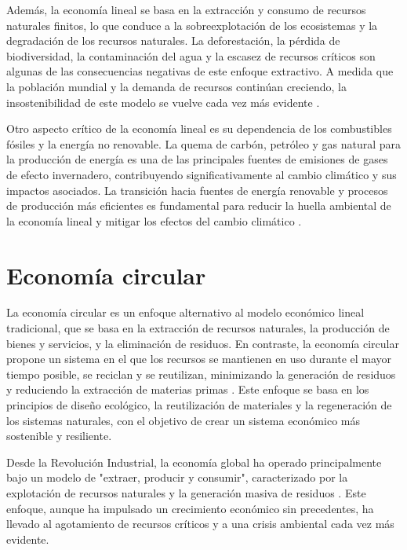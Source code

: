 \documentclass[main.tex]{subfiles}
\begin{document}
Además, la economía lineal se basa en la extracción y consumo de recursos naturales finitos, lo que conduce a la sobreexplotación de los ecosistemas y la degradación de los recursos naturales. La deforestación, la pérdida de biodiversidad, la contaminación del agua y la escasez de recursos críticos son algunas de las consecuencias negativas de este enfoque extractivo. A medida que la población mundial y la demanda de recursos continúan creciendo, la insostenibilidad de este modelo se vuelve cada vez más evidente \cite{clima2022book}.

Otro aspecto crítico de la economía lineal es su dependencia de los combustibles fósiles y la energía no renovable. La quema de carbón, petróleo y gas natural para la producción de energía es una de las principales fuentes de emisiones de gases de efecto invernadero, contribuyendo significativamente al cambio climático y sus impactos asociados. La transición hacia fuentes de energía renovable y procesos de producción más eficientes es fundamental para reducir la huella ambiental de la economía lineal y mitigar los efectos del cambio climático \cite{clima2022book, onu2024ods}.

\section{Economía circular}

La economía circular es un enfoque alternativo al modelo económico lineal tradicional, que se basa en la extracción de recursos naturales, la producción de bienes y servicios, y la eliminación de residuos. En contraste, la economía circular propone un sistema en el que los recursos se mantienen en uso durante el mayor tiempo posible, se reciclan y se reutilizan, minimizando la generación de residuos y reduciendo la extracción de materias primas \cite{ellenmacarthurfoundation2022}. Este enfoque se basa en los principios de diseño ecológico, la reutilización de materiales y la regeneración de los sistemas naturales, con el objetivo de crear un sistema económico más sostenible y resiliente.

Desde la Revolución Industrial, la economía global ha operado principalmente bajo un modelo de "extraer, producir y consumir", caracterizado por la explotación de recursos naturales y la generación masiva de residuos \cite{cerda2016economia}. Este enfoque, aunque ha impulsado un crecimiento económico sin precedentes, ha llevado al agotamiento de recursos críticos y a una crisis ambiental cada vez más evidente.
\end{document}
